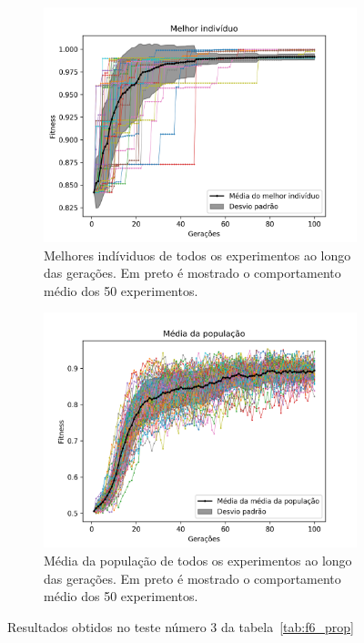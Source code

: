 \documentclass[12pt]{article}
\begin{document}
\begin{figure}[htb]
	\begin{subfigure}{.45\textwidth}
		\centering
		\includegraphics[width=1\textwidth]{./imgs/results/0_fitness_vs_gen_best.png}
		\caption{Melhores indíviduos de todos os experimentos ao longo das gerações.
		Em preto é mostrado o comportamento médio dos 50 experimentos. }
	\end{subfigure}
	\hfill
	\begin{subfigure}{.45\textwidth}
		\centering
		\includegraphics[width=1\textwidth]{./imgs/results/0_fitness_vs_gen_pop.png}
		\caption{Média da população de todos os experimentos ao longo das gerações.
		Em preto é mostrado o comportamento médio dos 50 experimentos.}
	\end{subfigure}
	\caption{Resultados obtidos no teste número 3 da tabela~\ref{tab:f6_prop}}
\end{figure}
\end{document}
